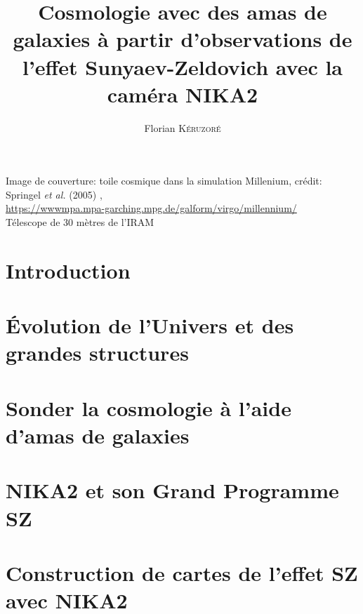 \documentclass[a4paper, 12pt, twoside]{book}
\title{Cosmologie avec des amas de galaxies à partir d'observations de l'effet Sunyaev-Zeldovich avec la caméra NIKA2}
\author{Florian \textsc{K\'eruzor\'e}}
\date{}
\begin{document}
\begin{titlepage}
    
\end{titlepage}

\phantom{ }
\vfill
{\footnotesize \noindent
    Image de couverture: toile cosmique dans la simulation Millenium,
    crédit: Springel \textit{et al.} (2005) \cite{springel_simulations_2005}, \\
    \url{https://wwwmpa.mpa-garching.mpg.de/galform/virgo/millennium/} \\
    Télescope de 30 mètres de l'IRAM
}

\setlength{\parskip}{2.5pt}
\dominitoc[n]
\tableofcontents
\adjustmtc
\setlength{\parskip}{5pt}


\chapter*{Introduction}
\label{chap:intro}


\chapter{Évolution de l'Univers et des grandes structures}
\label{chap:cosmo1}
\minitoc


\chapter{Sonder la cosmologie à l'aide d'amas de galaxies}
\label{chap:amas}
\minitoc


\chapter{NIKA2 et son Grand Programme SZ}
\label{chap:nika2}
\minitoc


\chapter{Construction de cartes de l'effet SZ avec NIKA2}
\label{chap:decorr}
\minitoc

\end{document}

